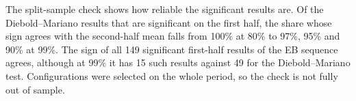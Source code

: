 The split-sample check shows how reliable the significant results are. Of
the
Diebold--Mariano results that are significant on the first half, the share
whose sign agrees with the second-half mean falls from 100\% at 80\% to
97\%, 95\% and 90\% at 99\%. The sign of all 149 significant first-half
results of the EB sequence agrees, although at 99\% it has 15 such results
against 49 for the
Diebold--Mariano test. Configurations were selected on the whole period, so
the check is not fully out of sample.

\begin{table}[t]
\centering\small
\caption{Comparisons of six online conformal methods on seven data sets,
15 pairs each. Misses: rounds on which at least one interval misses,
median per pair. Significant: the
procedure separates the pair over the evaluation period (DM: two-sided
5\%; EB: tuned 95\% confidence sequence; Hoeffding: 95\% Hoeffding-type
sequence). First half:
number of significant results on the first half of the evaluation period,
and the share of those whose sign agrees with the mean on the second
half.}
\label{tab:empirical}

\end{table}
